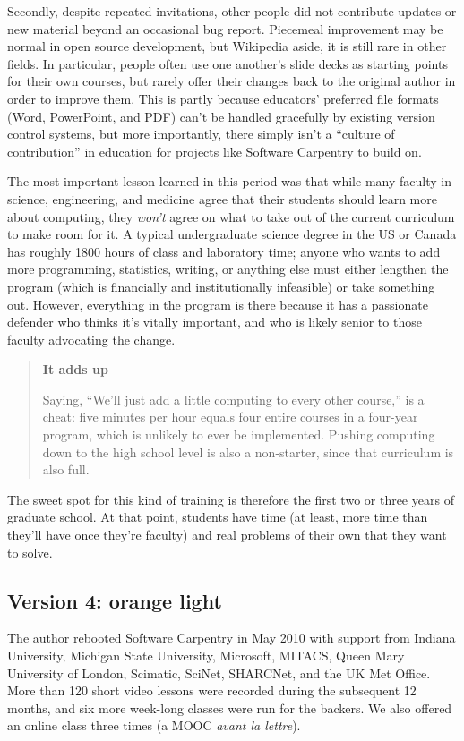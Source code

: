 \documentclass[10pt,a4paper,twocolumn]{article}
\begin{document}
Secondly, despite repeated invitations, other people did not
contribute updates or new material beyond an occasional bug report.
Piecemeal improvement may be normal in open source development, but
Wikipedia aside, it is still rare in other fields. In particular,
people often use one another's slide decks as starting points for
their own courses, but rarely offer their changes back to the original
author in order to improve them. This is partly because educators'
preferred file formats (Word, PowerPoint, and PDF) can't be handled
gracefully by existing version control systems, but more importantly,
there simply isn't a ``culture of contribution'' in education for
projects like Software Carpentry to build on.

The most important lesson learned in this period was that while many
faculty in science, engineering, and medicine agree that their
students should learn more about computing, they \emph{won't} agree on
what to take out of the current curriculum to make room for it. A
typical undergraduate science degree in the US or Canada has roughly
1800 hours of class and laboratory time; anyone who wants to add more
programming, statistics, writing, or anything else must either
lengthen the program (which is financially and institutionally
infeasible) or take something out. However, everything in the program
is there because it has a passionate defender who thinks it's vitally
important, and who is likely senior to those faculty advocating the
change.

\begin{quote}
\textbf{It adds up}

Saying, ``We'll just add a little computing to every other course,'' is
a cheat: five minutes per hour equals four entire courses in a four-year
program, which is unlikely to ever be implemented. Pushing computing
down to the high school level is also a non-starter, since that
curriculum is also full.
\end{quote}

The sweet spot for this kind of training is therefore the first two or
three years of graduate school. At that point, students have time (at
least, more time than they'll have once they're faculty) and real
problems of their own that they want to solve.

\subsection*{Version 4: orange light}

The author rebooted Software Carpentry in May 2010 with support from
Indiana University, Michigan State University, Microsoft, MITACS, Queen
Mary University of London, Scimatic, SciNet, SHARCNet, and the UK Met
Office. More than 120 short video lessons were recorded during the
subsequent 12 months, and six more week-long classes were run for the
backers. We also offered an online class three times (a MOOC \emph{avant
la lettre}).
\end{document}
